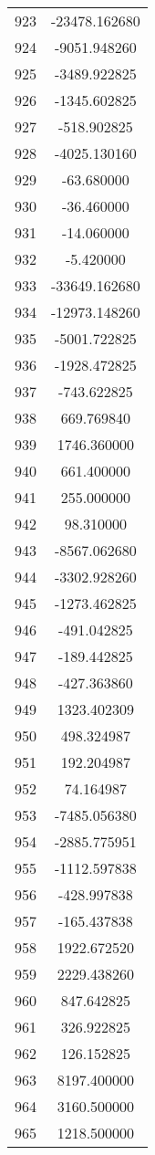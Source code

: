 \documentclass[12pt]{article}
\begin{document}
\begin{longtable}{@{}cc@{}}
923 & -23478.162680 \\
924 & -9051.948260 \\
925 & -3489.922825 \\
926 & -1345.602825 \\
927 & -518.902825 \\
928 & -4025.130160 \\
929 & -63.680000 \\
930 & -36.460000 \\
931 & -14.060000 \\
932 & -5.420000 \\
933 & -33649.162680 \\
934 & -12973.148260 \\
935 & -5001.722825 \\
936 & -1928.472825 \\
937 & -743.622825 \\
938 & 669.769840 \\
939 & 1746.360000 \\
940 & 661.400000 \\
941 & 255.000000 \\
942 & 98.310000 \\
943 & -8567.062680 \\
944 & -3302.928260 \\
945 & -1273.462825 \\
946 & -491.042825 \\
947 & -189.442825 \\
948 & -427.363860 \\
949 & 1323.402309 \\
950 & 498.324987 \\
951 & 192.204987 \\
952 & 74.164987 \\
953 & -7485.056380 \\
954 & -2885.775951 \\
955 & -1112.597838 \\
956 & -428.997838 \\
957 & -165.437838 \\
958 & 1922.672520 \\
959 & 2229.438260 \\
960 & 847.642825 \\
961 & 326.922825 \\
962 & 126.152825 \\
963 & 8197.400000 \\
964 & 3160.500000 \\
965 & 1218.500000 \\

\end{longtable}
\end{document}
